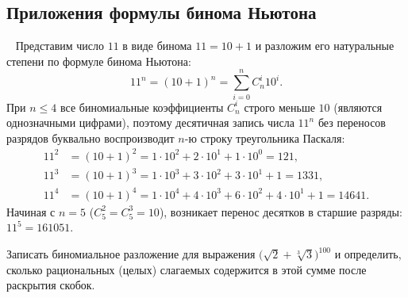 \subsection{Приложения формулы бинома Ньютона}

\begin{example} ~
    Представим число $11$ в виде бинома $11 = 10 + 1$ и разложим его 
    натуральные степени по формуле бинома Ньютона:
    \[
        11^n = (10 + 1)^n = \sum_{i=0}^{n} C_n^i 10^i.
    \]
    При $n \le 4$ все биномиальные коэффициенты $C_n^i$ строго меньше $10$ 
    (являются однозначными цифрами), поэтому десятичная запись числа $11^n$ 
    без переносов разрядов буквально воспроизводит $n$-ю строку 
    треугольника Паскаля:
    \begin{align*}
        11^2 &= (10 + 1)^2 = 1 \cdot 10^2 + 2 \cdot 10^1 + 1 \cdot 10^0 = 121, \\
        11^3 &= (10 + 1)^3 = 1 \cdot 10^3 + 3 \cdot 10^2 + 3 \cdot 10^1 + 1 = 1331, \\
        11^4 &= (10 + 1)^4 = 1 \cdot 10^4 + 4 \cdot 10^3 + 6 \cdot 10^2 + 
        4 \cdot 10^1 + 1 = 14641.
    \end{align*}
    Начиная с $n = 5$ ($C_5^2 = C_5^3 = 10$), возникает перенос десятков в 
    старшие разряды: $11^5 = 161051$.
\end{example}

\begin{problem}
    Записать биномиальное разложение для выражения 
    $\bigl(\sqrt{2} + \sqrt[3]{3}\bigr)^{100}$ и определить, сколько 
    рациональных (целых) слагаемых содержится в этой сумме после раскрытия 
    скобок.
\end{problem}


